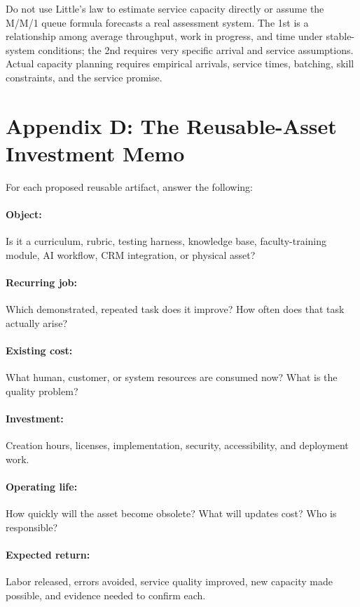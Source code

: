 Do not use Little's law to estimate service capacity directly or assume the M/M/1 queue formula forecasts a real assessment system. The 1st is a relationship among average throughput, work in progress, and time under stable-system conditions; the 2nd requires very specific arrival and service assumptions. Actual capacity planning requires empirical arrivals, service times, batching, skill constraints, and the service promise.

\section*{Appendix D: The Reusable-Asset Investment Memo}

For each proposed reusable artifact, answer the following:

\paragraph*{Object:} Is it a curriculum, rubric, testing harness, knowledge base, faculty-training module, AI workflow, CRM integration, or physical asset?

\paragraph*{Recurring job:} Which demonstrated, repeated task does it improve? How often does that task actually arise?

\paragraph*{Existing cost:} What human, customer, or system resources are consumed now? What is the quality problem?

\paragraph*{Investment:} Creation hours, licenses, implementation, security, accessibility, and deployment work.

\paragraph*{Operating life:} How quickly will the asset become obsolete? What will updates cost? Who is responsible?

\paragraph*{Expected return:} Labor released, errors avoided, service quality improved, new capacity made possible, and evidence needed to confirm each.


